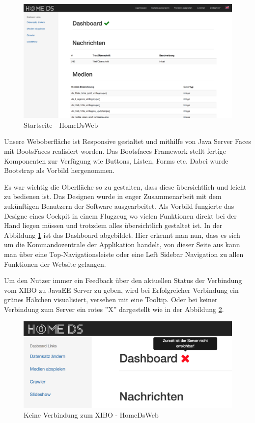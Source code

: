 \begin{figure}[H]
\centering
\includegraphics[width=1\textwidth]{images/08_HomeDsWeb/DashboardHomeDsWeb.png}
\caption{Startseite - HomeDsWeb}
\label{img:Startseite}
\end{figure}

Unsere Weboberfläche ist Responsive gestaltet und mithilfe von Java Server Faces mit BootsFaces realisiert worden. Das Bootsfaces Framework stellt fertige Komponenten zur Verfügung wie Buttons, Listen, Forms etc. Dabei wurde Bootstrap als Vorbild hergenommen.

Es war wichtig die Oberfläche so zu gestalten, dass diese übersichtlich und leicht zu bedienen ist. Das Designen wurde in enger Zusammenarbeit mit dem zukünftigen Benutzern der Software ausgearbeitet. Als Vorbild fungierte das Designe eines Cockpit in einem Flugzeug wo vielen Funktionen direkt bei der Hand liegen müssen und trotzdem alles übersichtlich gestaltet ist. In der Abbildung \ref{img:Startseite} ist das Dashboard abgebildet. 
Hier erkennt man nun, dass es sich um die Kommandozentrale der Applikation handelt, von dieser Seite aus kann man über eine Top-Navigationsleiste oder eine Left Sidebar Navigation zu allen Funktionen der Website gelangen. 

Um den Nutzer immer ein Feedback über den aktuellen Status der Verbindung vom XIBO zu JavaEE Server zu geben, wird bei Erfolgreicher Verbindung ein grünes Häkchen visualisiert, versehen mit eine Tooltip. Oder bei keiner Verbindung zum Server ein rotes ''X'' dargestellt wie in der Abbildung  \ref{img:NoConnection}.

\begin{figure}[H]
\includegraphics[width=1\textwidth]{images/08_HomeDsWeb/DashboardNoConnection.png}
\caption{Keine Verbindung zum XIBO - HomeDsWeb}
\label{img:NoConnection}
\end{figure}

